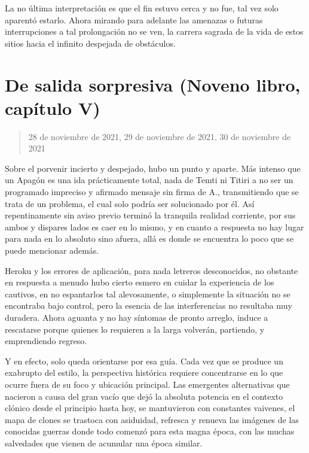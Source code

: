\documentclass[
]{book}
\begin{document}
La no última interpretación es que el fin estuvo cerca y no fue, tal vez solo aparentó estarlo. Ahora mirando para adelante las amenazas o futuras interrupciones a tal prolongación no se ven, la carrera sagrada de la vida de estos sitios hacia el infinito despejada de obstáculos.

\hypertarget{de-salida-sorpresiva-noveno-libro-capuxedtulo-v}{%
\section{De salida sorpresiva (Noveno libro, capítulo V)}\label{de-salida-sorpresiva-noveno-libro-capuxedtulo-v}}

\begin{quote}
28 de noviembre de 2021, 29 de noviembre de 2021, 30 de noviembre de 2021
\end{quote}

Sobre el porvenir incierto y despejado, hubo un punto y aparte. Más intenso que un Apagón es una ida prácticamente total, nada de Temti ni Titiri a no ser un programado impreciso y afirmado mensaje sin firma de A., transmitiendo que se trata de un problema, el cual solo podría ser solucionado por él. Así repentinamente sin aviso previo terminó la tranquila realidad corriente, por sus ambos y dispares lados es caer en lo mismo, y en cuanto a respuesta no hay lugar para nada en lo absoluto sino afuera, allá es donde se encuentra lo poco que se puede mencionar además.

Heroku y los errores de aplicación, para nada letreros desconocidos, no obstante en respuesta a menudo hubo cierto esmero en cuidar la experiencia de los cautivos, en no espantarlos tal alevosamente, o simplemente la situación no se encontraba bajo control, pero la esencia de las interferencias no resultaba muy duradera. Ahora aguanta y no hay síntomas de pronto arreglo, induce a rescatarse porque quienes lo requieren a la larga volverán, partiendo, y emprendiendo regreso.

Y en efecto, solo queda orientarse por esa guía. Cada vez que se produce un exabrupto del estilo, la perspectiva histórica requiere concentrarse en lo que ocurre fuera de su foco y ubicación principal. Las emergentes alternativas que nacieron a causa del gran vacío que dejó la absoluta potencia en el contexto clónico desde el principio hasta hoy, se mantuvieron con constantes vaivenes, el mapa de clones se trastoca con asiduidad, refresca y renueva las imágenes de las conocidas guerras donde todo comenzó para esta magna época, con las muchas salvedades que vienen de acumular una época similar.
\end{document}
